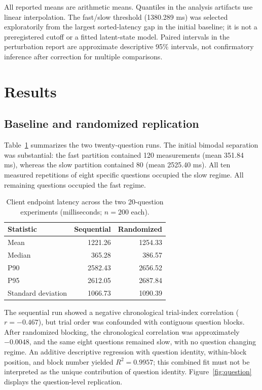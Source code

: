 \documentclass[10pt,twocolumn]{article}
\begin{document}
All reported means are arithmetic means. Quantiles in the analysis artifacts use linear interpolation. The fast/slow threshold (1380.289 ms) was selected exploratorily from the largest sorted-latency gap in the initial baseline; it is not a preregistered cutoff or a fitted latent-state model. Paired intervals in the perturbation report are approximate descriptive 95\% intervals, not confirmatory inference after correction for multiple comparisons.

\section{Results}
\subsection{Baseline and randomized replication}
Table~\ref{tab:aggregate} summarizes the two twenty-question runs. The initial bimodal separation was substantial: the fast partition contained 120 measurements (mean 351.84 ms), whereas the slow partition contained 80 (mean 2525.40 ms). All ten measured repetitions of eight specific questions occupied the slow regime. All remaining questions occupied the fast regime.

\begin{table}[t]
\centering\caption{Client endpoint latency across the two 20-question experiments (milliseconds; $n=200$ each).}\label{tab:aggregate}
\small\begin{tabular}{lrr}\toprule
Statistic & Sequential & Randomized\\\midrule
Mean & 1221.26 & 1254.33\\
Median & 365.28 & 386.57\\
P90 & 2582.43 & 2656.52\\
P95 & 2612.05 & 2687.84\\
Standard deviation & 1066.73 & 1090.39\\\bottomrule
\end{tabular}
\end{table}

The sequential run showed a negative chronological trial-index correlation ($r=-0.467$), but trial order was confounded with contiguous question blocks. After randomized blocking, the chronological correlation was approximately $-0.0048$, and the same eight questions remained slow, with no question changing regime. An additive descriptive regression with question identity, within-block position, and block number yielded $R^2=0.9957$; this combined fit must not be interpreted as the unique contribution of question identity. Figure~\ref{fig:question} displays the question-level replication.
\end{document}
